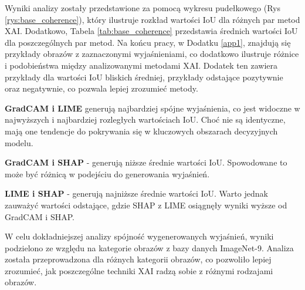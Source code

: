 Wyniki analizy zostały przedstawione za pomocą wykresu pudełkowego (Rys \ref{rys:base_coherence}), który ilustruje rozkład wartości IoU dla różnych par metod XAI.
Dodatkowo, Tabela \ref{tab:base_coherence} przedstawia średnich wartości IoU dla poszczególnych par metod.
Na końcu pracy, w Dodatku \ref{app1}, znajdują się przykłady obrazów z zaznaczonymi wyjaśnieniami, co dodatkowo ilustruje różnice i podobieństwa między analizowanymi metodami XAI.
Dodatek ten zawiera przykłady dla wartości IoU bliskich średniej, przykłady odstające pozytywnie oraz negatywnie, co pozwala lepiej zrozumieć metody.

\textbf{GradCAM i LIME} generują najbardziej spójne wyjaśnienia, co jest widoczne w najwyższych i najbardziej rozległych wartościach IoU.
Choć nie są identyczne, mają one tendencje do pokrywania się w kluczowych obszarach decyzyjnych modelu.

\textbf{GradCAM i SHAP} - generują niższe średnie wartości IoU.
Spowodowane to może być różnicą w podejściu do generowania wyjaśnień.

\textbf{LIME i SHAP} - generują najniższe średnie wartości IoU.
Warto jednak zauważyć wartości odstające, gdzie SHAP z LIME osiągnęły wyniki wyższe od GradCAM i SHAP.

\vspace{1cm}

W celu dokładniejszej analizy spójność wygenerowanych wyjaśnień, wyniki podzielono ze względu na kategorie obrazów z bazy danych ImageNet-9.
Analiza została przeprowadzona dla różnych kategorii obrazów, co pozwoliło lepiej zrozumieć, jak poszczególne techniki XAI radzą sobie z różnymi rodzajami obrazów.

